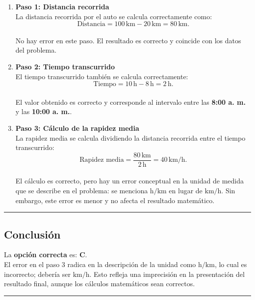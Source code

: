 \documentclass[
]{article}
\begin{document}
\begin{enumerate}
\def\labelenumi{\arabic{enumi}.}
\item
  \textbf{Paso 1: Distancia recorrida}\\
  La distancia recorrida por el auto se calcula correctamente como:\\
  \[
  \text{Distancia} = 100 \, \text{km} - 20 \, \text{km} = 80 \, \text{km}.
  \]\\
  No hay error en este paso. El resultado es correcto y coincide con los
  datos del problema.
\item
  \textbf{Paso 2: Tiempo transcurrido}\\
  El tiempo transcurrido también se calcula correctamente:\\
  \[
  \text{Tiempo} = 10 \, \text{h} - 8 \, \text{h} = 2 \, \text{h}.
  \]\\
  El valor obtenido es correcto y corresponde al intervalo entre las
  \textbf{8:00 a. m.} y las \textbf{10:00 a. m.}.
\item
  \textbf{Paso 3: Cálculo de la rapidez media}\\
  La rapidez media se calcula dividiendo la distancia recorrida entre el
  tiempo transcurrido:\\
  \[
  \text{Rapidez media} = \frac{80 \, \text{km}}{2 \, \text{h}} = 40 \, \text{km/h}.
  \]\\
  El cálculo es correcto, pero hay un error conceptual en la unidad de
  medida que se describe en el problema: se menciona \(\text{h/km}\) en
  lugar de \(\text{km/h}\). Sin embargo, este error es menor y no afecta
  el resultado matemático.
\end{enumerate}

\begin{center}\rule{0.5\linewidth}{0.5pt}\end{center}

\subsection{Conclusión}\label{conclusiuxf3n-7}

La \textbf{opción correcta} es: \textbf{C}.\\
El error en el paso 3 radica en la descripción de la unidad como
\(\text{h/km}\), lo cual es incorrecto; debería ser \(\text{km/h}\).
Esto refleja una imprecisión en la presentación del resultado final,
aunque los cálculos matemáticos sean correctos.

\begin{center}\rule{0.5\linewidth}{0.5pt}\end{center}
\end{document}

